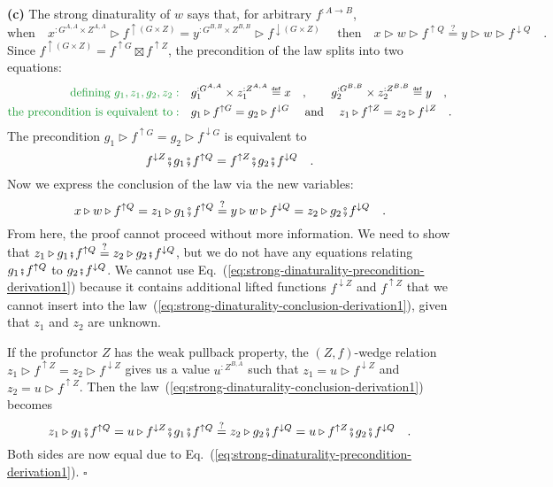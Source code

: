 \textbf{(c)} The strong dinaturality of $w$ says that, for arbitrary
$f^{:A\rightarrow B}$,
\[
\text{when}\quad x^{:G^{A,A}\times Z^{A,A}}\triangleright f^{\uparrow(G\times Z)}=y^{:G^{B,B}\times Z^{B,B}}\triangleright f^{\downarrow(G\times Z)}\quad\text{ then}\quad x\triangleright w\triangleright f^{\uparrow Q}\overset{?}{=}y\triangleright w\triangleright f^{\downarrow Q}\quad.
\]
Since $f^{\uparrow(G\times Z)}=f^{\uparrow G}\boxtimes f^{\uparrow Z}$,
the precondition of the law splits into two equations:
\begin{align*}
{\color{greenunder}\text{defining }g_{1},z_{1},g_{2},z_{2}:}\quad & g_{1}^{:G^{A,A}}\times z_{1}^{:Z^{A,A}}\triangleq x\quad,\quad\quad g_{2}^{:G^{B,B}}\times z_{2}^{:Z^{B,B}}\triangleq y\quad,\\
{\color{greenunder}\text{the precondition is equivalent to}:}\quad & g_{1}\triangleright f^{\uparrow G}=g_{2}\triangleright f^{\downarrow G}\quad\text{ and }\quad z_{1}\triangleright f^{\uparrow Z}=z_{2}\triangleright f^{\downarrow Z}\quad.
\end{align*}
The precondition $g_{1}\triangleright f^{\uparrow G}=g_{2}\triangleright f^{\downarrow G}$
is equivalent to
\begin{equation}
f^{\downarrow Z}\bef g_{1}\bef f^{\uparrow Q}=f^{\uparrow Z}\bef g_{2}\bef f^{\downarrow Q}\quad.\label{eq:strong-dinaturality-precondition-derivation1}
\end{equation}
Now we express the conclusion of the law via the new variables:
\begin{equation}
x\triangleright w\triangleright f^{\uparrow Q}=z_{1}\triangleright g_{1}\bef f^{\uparrow Q}\overset{?}{=}y\triangleright w\triangleright f^{\downarrow Q}=z_{2}\triangleright g_{2}\bef f^{\downarrow Q}\quad.\label{eq:strong-dinaturality-conclusion-derivation1}
\end{equation}
From here, the proof cannot proceed without more information. We need
to show that $z_{1}\triangleright g_{1}\bef f^{\uparrow Q}\overset{?}{=}z_{2}\triangleright g_{2}\bef f^{\downarrow Q}$,
but we do not have any equations relating $g_{1}\bef f^{\uparrow Q}$
to $g_{2}\bef f^{\downarrow Q}$. We cannot use Eq.~(\ref{eq:strong-dinaturality-precondition-derivation1})
because it contains additional lifted functions $f^{\downarrow Z}$
and $f^{\uparrow Z}$ that we cannot insert into the law~(\ref{eq:strong-dinaturality-conclusion-derivation1}),
given that $z_{1}$ and $z_{2}$ are unknown. 

If the profunctor $Z$ has the weak pullback property, the $\left(Z,f\right)$-wedge
relation $z_{1}\triangleright f^{\uparrow Z}=z_{2}\triangleright f^{\downarrow Z}$
gives us a value $u^{:Z^{B,A}}$ such that $z_{1}=u\triangleright f^{\downarrow Z}$
and $z_{2}=u\triangleright f^{\uparrow Z}$. Then the law~(\ref{eq:strong-dinaturality-conclusion-derivation1})
becomes
\[
z_{1}\triangleright g_{1}\bef f^{\uparrow Q}=u\triangleright f^{\downarrow Z}\bef g_{1}\bef f^{\uparrow Q}\overset{?}{=}z_{2}\triangleright g_{2}\bef f^{\downarrow Q}=u\triangleright f^{\uparrow Z}\bef g_{2}\bef f^{\downarrow Q}\quad.
\]
Both sides are now equal due to Eq.~(\ref{eq:strong-dinaturality-precondition-derivation1}).
$\square$

